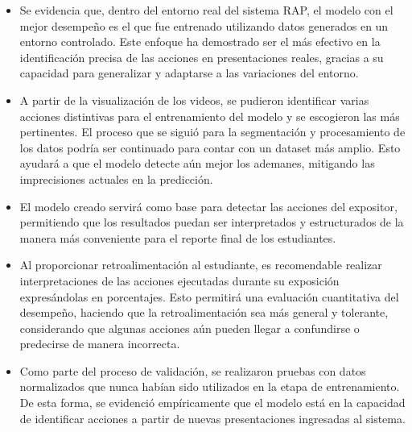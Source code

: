     \begin{itemize}
        \item Se evidencia que, dentro del entorno real del sistema RAP, el modelo con el mejor desempeño es el que fue entrenado utilizando datos generados en un entorno controlado. Este enfoque ha demostrado ser el más efectivo en la identificación precisa de las acciones en presentaciones reales, gracias a su capacidad para generalizar y adaptarse a las variaciones del entorno.
        
        \item A partir de la visualización de los videos, se pudieron identificar varias acciones distintivas para el entrenamiento del modelo y se escogieron las más pertinentes. El proceso que se siguió para la segmentación y procesamiento de los datos podría ser continuado para contar con un dataset más amplio. Esto ayudará a que el modelo detecte aún mejor los ademanes, mitigando las imprecisiones actuales en la predicción.
        
        \item El modelo creado servirá como base para detectar las acciones del expositor, permitiendo que los resultados puedan ser interpretados y estructurados de la manera más conveniente para el reporte final de los estudiantes.
        
        \item Al proporcionar retroalimentación al estudiante, es recomendable realizar interpretaciones de las acciones ejecutadas durante su exposición expresándolas en porcentajes. Esto permitirá una evaluación cuantitativa del desempeño, haciendo que la retroalimentación sea más general y tolerante, considerando que algunas acciones aún pueden llegar a confundirse o predecirse de manera incorrecta.
        
        \item Como parte del proceso de validación, se realizaron pruebas con datos normalizados que nunca habían sido utilizados en la etapa de entrenamiento. De esta forma, se evidenció empíricamente que el modelo está en la capacidad de identificar acciones a partir de nuevas presentaciones ingresadas al sistema.
    \end{itemize}

